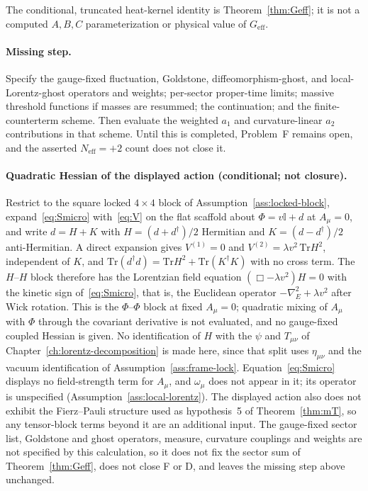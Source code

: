The conditional, truncated heat-kernel identity is
Theorem~\ref{thm:Geff}; it is not a computed \(A,B,C\)
parameterization or physical value of \(G_{\mathrm{eff}}\).

\paragraph{Missing step.}
Specify the gauge-fixed fluctuation, Goldstone, diffeomorphism-ghost,
and local-Lorentz-ghost operators and weights; per-sector proper-time
limits; massive threshold functions if masses are resummed; the
continuation; and the finite-counterterm scheme. Then evaluate the
weighted \(a_1\) and curvature-linear \(a_2\) contributions in that
scheme. Until this is completed, Problem~F remains open, and the
asserted \(N_{\mathrm{eff}}=+2\) count does not close it.

\paragraph{Quadratic Hessian of the displayed action (conditional; not closure).}
Restrict to the square locked \(4\times4\) block of
Assumption~\ref{ass:locked-block}, expand~\eqref{eq:Smicro} with~\eqref{eq:V}
on the flat scaffold about \(\Phi=v\mathbb I+d\) at \(A_\mu=0\), and write
\(d=H+K\) with \(H=(d+d^\dagger)/2\) Hermitian and \(K=(d-d^\dagger)/2\)
anti-Hermitian. A direct expansion gives \(V^{(1)}=0\) and
\(V^{(2)}=\lambda v^2\,\mathrm{Tr}H^2\), independent of \(K\), and
\(\mathrm{Tr}(d^\dagger d)=\mathrm{Tr}H^2+\mathrm{Tr}(K^\dagger K)\) with no
cross term. The \(H\)--\(H\) block therefore has the Lorentzian field
equation \((\Box-\lambda v^2)H=0\) with the kinetic sign of~\eqref{eq:Smicro},
that is, the Euclidean operator \(-\nabla_E^2+\lambda v^2\) after Wick
rotation. This is the \(\Phi\)--\(\Phi\) block at fixed \(A_\mu=0\);
quadratic mixing of \(A_\mu\) with \(\Phi\) through the covariant
derivative is not evaluated, and no gauge-fixed coupled Hessian is given.
No identification of \(H\) with the \(\psi\) and \(T_{\mu\nu}\) of
Chapter~\ref{ch:lorentz-decomposition} is made here, since that split uses
\(\eta_{\mu\nu}\) and the vacuum identification of
Assumption~\ref{ass:frame-lock}. Equation~\eqref{eq:Smicro} displays no
field-strength term for \(A_\mu\), and \(\omega_\mu\) does not appear in it;
its operator is unspecified (Assumption~\ref{ass:local-lorentz}). The
displayed action also does not exhibit the Fierz--Pauli structure used as
hypothesis~5 of Theorem~\ref{thm:mT}, so any tensor-block terms beyond it
are an additional input. The gauge-fixed sector list, Goldstone and ghost
operators, measure, curvature couplings and weights are not specified by
this calculation, so it does not fix the sector sum of
Theorem~\ref{thm:Geff}, does not close F or D, and leaves the missing step
above unchanged.


